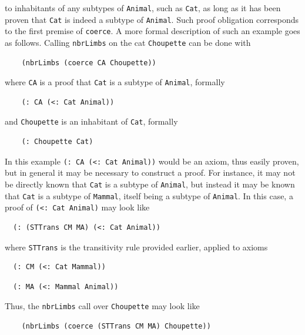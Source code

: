 \documentclass[]{report}
\begin{document}
\begin{enumerate}
  to inhabitants of any subtypes of \texttt{Animal}, such
  as \texttt{Cat}, as long as it has been proven that
  \texttt{Cat} is indeed a subtype of
  \texttt{Animal}.  Such proof obligation corresponds to
  the first premise of \texttt{coerce}.  A more formal
  description of such an example goes as follows.  Calling
  \texttt{nbrLimbs} on the cat
  \texttt{Choupette} can be done with
  \begin{verbatim}
    (nbrLimbs (coerce CA Choupette))
  \end{verbatim}
  where \texttt{CA} is a proof that
  \texttt{Cat} is a subtype of
  \texttt{Animal}, formally
  \begin{verbatim}
    (: CA (<: Cat Animal))
  \end{verbatim}
  and \texttt{Choupette} is an inhabitant of
  \texttt{Cat}, formally
  \begin{verbatim}
    (: Choupette Cat)
  \end{verbatim}
  In this example \texttt{(: CA (<: Cat Animal))} would be
  an axiom, thus easily proven, but in general it may be necessary to
  construct a proof.  For instance, it may not be directly known that
  \texttt{Cat} is a subtype of
  \texttt{Animal}, but instead it may be known that
  \texttt{Cat} is a subtype of
  \texttt{Mammal}, itself being a subtype of
  \texttt{Animal}.  In this case, a proof of
  \texttt{(<: Cat Animal)} may look like
  \begin{verbatim}
  (: (STTrans CM MA) (<: Cat Animal))
  \end{verbatim}
  where \texttt{STTrans} is the transitivity rule provided
  earlier, applied to axioms
  \begin{verbatim}
  (: CM (<: Cat Mammal))
  \end{verbatim}
  \begin{verbatim}
  (: MA (<: Mammal Animal))
  \end{verbatim}
  Thus, the \texttt{nbrLimbs} call over
  \texttt{Choupette} may look like
  \begin{verbatim}
    (nbrLimbs (coerce (STTrans CM MA) Choupette))
  \end{verbatim}
\end{enumerate}
\end{document}
